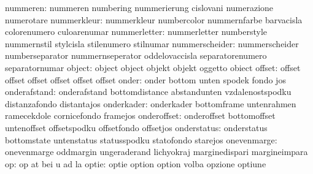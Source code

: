                  nummeren: nummeren                  numbering
                           nummerierung              cislovani
                           numerazione               numerotare
              nummerkleur: nummerkleur               numbercolor
                           nummernfarbe              barvacisla
                           colorenumero              culoarenumar
             nummerletter: nummerletter              numberstyle
                           nummernstil               stylcisla
                           stilenumero               stilnumar
           nummerscheider: nummerscheider            numberseparator
                           nummernseperator          oddelovaccisla
                           separatorenumero          separatornumar
                   object: object                    object
                           objekt                    objekt
                           oggetto                   obiect
                   offset: offset                    offset
                           offset                    offset
                           offset                    offset
                    onder: onder                     bottom
                           unten                     spodek
                           fondo                     jos
             onderafstand: onderafstand              bottomdistance
                           abstandunten              vzdalenostspodku
                           distanzafondo             distantajos
               onderkader: onderkader                bottomframe
                           untenrahmen               ramecekdole
                           cornicefondo              framejos
              onderoffset: onderoffset               bottomoffset
                           untenoffset               offsetspodku
                           offsetfondo               offsetjos
              onderstatus: onderstatus               bottomstate
                           untenstatus               statusspodku
                           statofondo                starejos
              onevenmarge: onevenmarge               oddmargin
                           ungeraderand              lichyokraj
                           marginedispari            margineimpara
                       op: op                        at
                           bei                       u
                           ad                        la 
                    optie: optie                     option
                           option                    volba
                           opzione                   optiune
